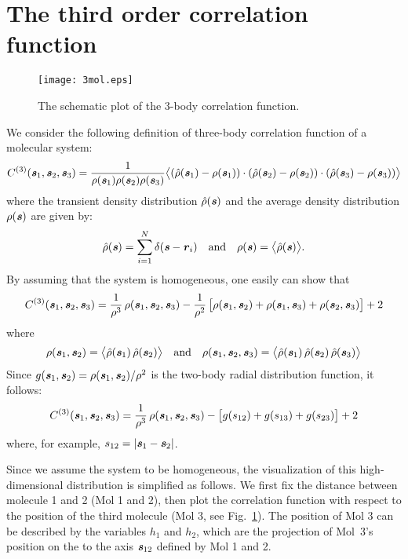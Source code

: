 \documentclass[aip,jcp,a4paper,reprint,onecolumn]{revtex4-1}
\newcommand{\redc}[1]{{\color{red} #1}}
\newcommand{\vect}[1]{\textbf{\textit{#1}}}
\newcommand{\corr}{C^{(3)}}
\begin{document}
\section{\redc{The third order correlation function}}
\label{app:3}
\redc{
\begin{figure}
  \centering
  \texttt{[image: 3mol.eps]}
  \caption{The schematic plot of the 3-body correlation function.}\label{fig:tmp3}
\end{figure}
We consider the following definition of three-body correlation function of a molecular system:
\begin{align}
  \corr (\vect s_1, \vect s_2, \vect s_3)
  =
  \frac1{\rho(\vect s_1)\rho(\vect s_2)\rho(\vect s_3)}
  \big\langle
  (\hat\rho(\vect s_1) - \rho(\vect s_1))\cdot
  (\hat\rho(\vect s_2) - \rho(\vect s_2))\cdot
  (\hat\rho(\vect s_3) - \rho(\vect s_3))
  \big\rangle
\end{align}
where the transient density distribution $\hat\rho(\vect s)$ and the
average density distribution $\rho(\vect s)$ are given
by:
\begin{align}
  \hat\rho(\vect s) = \sum_{i=1}^N\delta(\vect s - \vect r_i)
  \quad\textrm{and}\quad
  \rho(\vect s) = \big\langle \hat\rho(\vect s)\big\rangle.
\end{align}
By assuming that the system is homogeneous, one easily can show that
\begin{align}
  \corr (\vect s_1, \vect s_2, \vect s_3)
  =
  \frac1{\rho^3}\,\rho(\vect s_1, \vect s_2, \vect s_3) -
  \frac1{\rho^2}\,\big[
  \rho(\vect s_1, \vect s_2) +
  \rho(\vect s_1, \vect s_3) +
  \rho(\vect s_2, \vect s_3)
  \big] + 2
\end{align}
where
\begin{align}
  \rho(\vect s_1, \vect s_2)
  =
  \big\langle
  \hat\rho(\vect s_1)\,  \hat\rho(\vect s_2)
  \big\rangle
  \quad\textrm{and}\quad
  \rho(\vect s_1, \vect s_2, \vect s_3)
  =
  \big\langle
  \hat\rho(\vect s_1)\,  \hat\rho(\vect s_2)\, \hat\rho(\vect s_3)
  \big\rangle  
\end{align}
Since $g (\vect s_1, \vect s_2) = \rho(\vect s_1, \vect s_2)/\rho^2$
is the two-body radial distribution function, it follows:
\begin{align}
  \corr (\vect s_1, \vect s_2, \vect s_3)
  =
  \frac1{\rho^3}\,\rho(\vect s_1, \vect s_2, \vect s_3) -
  \big[
  g(s_{12}) +
  g(s_{13}) +
  g(s_{23})
  \big] + 2
\end{align}
where, for example, $s_{12} = \vert \vect s_1 -\vect s_2\vert$.

Since we assume the system to be homogeneous, the visualization of this high-dimensional
distribution is simplified as follows. We first fix the distance between molecule 1 and 2 (Mol 1 and 2), then plot the correlation function with
respect to the position of the third molecule (Mol 3, see
Fig.~\ref{fig:tmp3}).  The position of Mol 3 can be described by
the variables $h_1$ and $h_2$, which are
the projection of Mol~3's position on the to the
axis $\vect s_{12}$ defined by Mol 1 and 2.}
\end{document}
